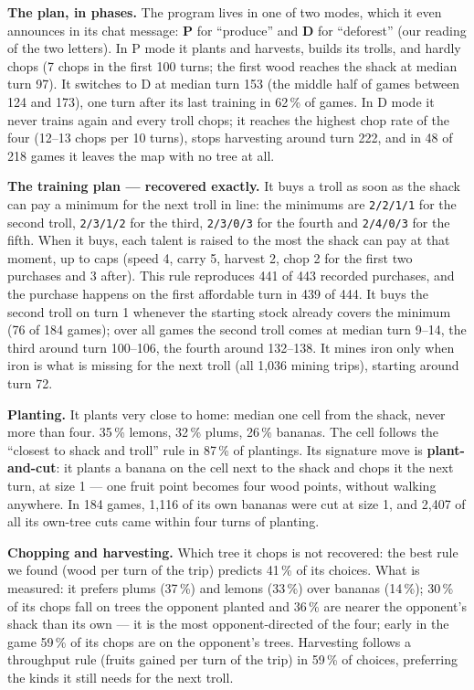 \documentclass[10pt,a4paper]{article}
\begin{document}
\textbf{The plan, in phases.} The program lives in one of two modes, which it even announces in its chat message: \textbf{P} for ``produce'' and \textbf{D} for ``deforest'' (our reading of the two letters). In P mode it plants and harvests, builds its trolls, and hardly chops (7 chops in the first 100 turns; the first wood reaches the shack at median turn 97). It switches to D at median turn 153 (the middle half of games between 124 and 173), one turn after its last training in 62\,\% of games. In D mode it never trains again and every troll chops; it reaches the highest chop rate of the four (12--13 chops per 10 turns), stops harvesting around turn 222, and in 48 of 218 games it leaves the map with no tree at all.

\textbf{The training plan --- recovered exactly.} It buys a troll as soon as the shack can pay a minimum for the next troll in line: the minimums are \texttt{2/2/1/1} for the second troll, \texttt{2/3/1/2} for the third, \texttt{2/3/0/3} for the fourth and \texttt{2/4/0/3} for the fifth. When it buys, each talent is raised to the most the shack can pay at that moment, up to caps (speed 4, carry 5, harvest 2, chop 2 for the first two purchases and 3 after). This rule reproduces 441 of 443 recorded purchases, and the purchase happens on the first affordable turn in 439 of 444. It buys the second troll on turn 1 whenever the starting stock already covers the minimum (76 of 184 games); over all games the second troll comes at median turn 9--14, the third around turn 100--106, the fourth around 132--138. It mines iron only when iron is what is missing for the next troll (all 1,036 mining trips), starting around turn 72.

\textbf{Planting.} It plants very close to home: median one cell from the shack, never more than four. 35\,\% lemons, 32\,\% plums, 26\,\% bananas. The cell follows the ``closest to shack and troll'' rule in 87\,\% of plantings. Its signature move is \textbf{plant-and-cut}: it plants a banana on the cell next to the shack and chops it the next turn, at size 1 --- one fruit point becomes four wood points, without walking anywhere. In 184 games, 1,116 of its own bananas were cut at size 1, and 2,407 of all its own-tree cuts came within four turns of planting.

\textbf{Chopping and harvesting.} Which tree it chops is not recovered: the best rule we found (wood per turn of the trip) predicts 41\,\% of its choices. What is measured: it prefers plums (37\,\%) and lemons (33\,\%) over bananas (14\,\%); 30\,\% of its chops fall on trees the opponent planted and 36\,\% are nearer the opponent's shack than its own --- it is the most opponent-directed of the four; early in the game 59\,\% of its chops are on the opponent's trees. Harvesting follows a throughput rule (fruits gained per turn of the trip) in 59\,\% of choices, preferring the kinds it still needs for the next troll.
\end{document}
